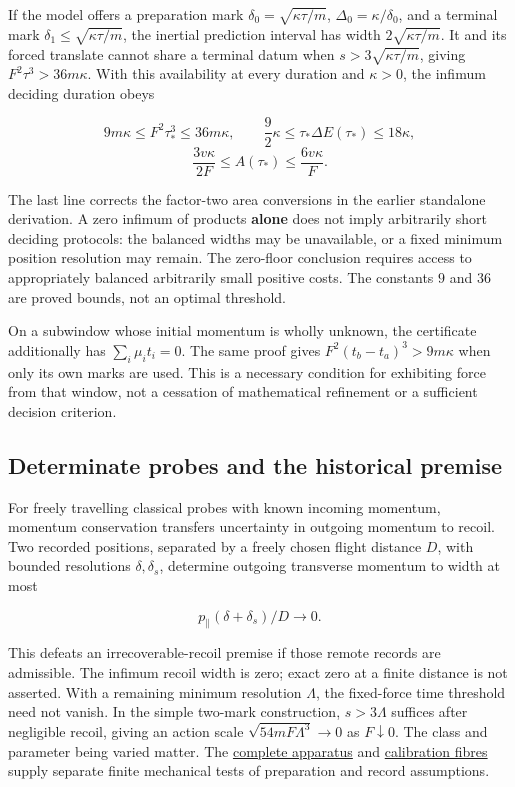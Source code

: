 \documentclass[11pt,a4paper]{article}
\begin{document}
If the model offers a preparation mark \(\delta_0=\sqrt{\kappa\tau/m}\),
\(\Delta_0=\kappa/\delta_0\), and a terminal mark
\(\delta_1\le\sqrt{\kappa\tau/m}\), the inertial prediction interval has
width \(2\sqrt{\kappa\tau/m}\). It and its forced translate cannot share
a terminal datum when \(s>3\sqrt{\kappa\tau/m}\), giving
\(F^2\tau^3>36m\kappa\). With this availability at every duration and
\(\kappa>0\), the infimum deciding duration obeys

\[9m\kappa\le F^2\tau_*^3\le36m\kappa,\qquad
\frac92\kappa\le\tau_*\Delta E(\tau_*)\le18\kappa,\]
\[\frac{3v\kappa}{2F}\le A(\tau_*)\le\frac{6v\kappa}{F}.\]

The last line corrects the factor-two area conversions in the earlier
standalone derivation. A zero infimum of products \textbf{alone} does
not imply arbitrarily short deciding protocols: the balanced widths may
be unavailable, or a fixed minimum position resolution may remain. The
zero-floor conclusion requires access to appropriately balanced
arbitrarily small positive costs. The constants \(9\) and \(36\) are
proved bounds, not an optimal threshold.

On a subwindow whose initial momentum is wholly unknown, the certificate
additionally has \(\sum_i\mu_it_i=0\). The same proof gives
\(F^2(t_b-t_a)^3>9m\kappa\) when only its own marks are used. This is a
necessary condition for exhibiting force from that window, not a
cessation of mathematical refinement or a sufficient decision criterion.

\hypertarget{determinate-probes-and-the-historical-premise}{%
\subsection{Determinate probes and the historical
premise}\label{determinate-probes-and-the-historical-premise}}

For freely travelling classical probes with known incoming momentum,
momentum conservation transfers uncertainty in outgoing momentum to
recoil. Two recorded positions, separated by a freely chosen flight
distance \(D\), with bounded resolutions \(\delta,\delta_s\), determine
outgoing transverse momentum to width at most

\[p_\parallel(\delta+\delta_s)/D\longrightarrow0.\]

This defeats an irrecoverable-recoil premise if those remote records are
admissible. The infimum recoil width is zero; exact zero at a finite
distance is not asserted. With a remaining minimum resolution
\(\Lambda\), the fixed-force time threshold need not vanish. In the
simple two-mark construction, \(s>3\Lambda\) suffices after negligible
recoil, giving an action scale \(\sqrt{54mF\Lambda^3}\to0\) as
\(F\downarrow0\). The class and parameter being varied matter. The
\href{autonomous-finite-readout.md}{complete apparatus} and
\href{calibration-tolerance-recovery.md}{calibration fibres} supply
separate finite mechanical tests of preparation and record assumptions.
\end{document}
